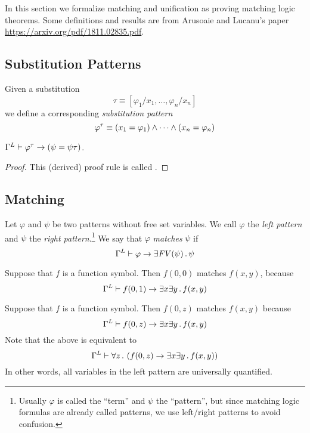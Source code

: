 \documentclass{article}
\begin{document}
In this section we formalize matching and unification as proving matching logic theorems.
Some definitions and results are from Arusoaie and Lucanu's paper \url{https://arxiv.org/pdf/1811.02835.pdf}. 

\subsection{Substitution Patterns}

\begin{definition}
Given a substitution
\[\tau \equiv [\varphi_1 / x_1 , \dots , \varphi_n / x_n] \]
we define a corresponding \emph{substitution pattern}
\[\varphi^\tau \equiv (x_1 = \varphi_1) \land \dots \land (x_n = \varphi_n) \]
\end{definition}

\begin{proposition}
$\Gamma^L \vdash \varphi^\tau \rightarrow (\psi = \psi\tau)$.
\end{proposition}
\begin{proof}
This (derived) proof rule is called . 
\end{proof}

\subsection{Matching}

\begin{definition}
\label{def:matching}
Let $\varphi$ and $\psi$ be two patterns without free set variables.
We call $\varphi$ the \emph{left pattern}
and $\psi$ the \emph{right pattern}.\footnote{Usually $\varphi$ is called the ``term'' and $\psi$ the ``pattern'', but since matching logic formulas are already called patterns, we use left/right patterns to avoid confusion.} 
We say that $\varphi$ \emph{matches} $\psi$
if
\[\Gamma^L \vdash \varphi \rightarrow \exists \mathit{FV(\psi)} \,.\, \psi \]
\end{definition}

\begin{example}
Suppose that $f$ is a function symbol. 
Then $f(0,0)$ matches $f(x,y)$, because
\[\Gamma^L \vdash f(0,1) \rightarrow \exists x \exists y \,.\, f(x,y)\]
\end{example}

\begin{example}
Suppose that $f$ is a function symbol.
Then $f(0,z)$ matches $f(x,y)$ because
\[\Gamma^L \vdash f(0,z) \rightarrow \exists x \exists y \,.\, f(x,y)\]
Note that the above is equivalent to
\[\Gamma^L \vdash \forall z \,.\, \left(f(0,z) \rightarrow \exists x \exists y \,.\, f(x,y)\right)\]
In other words, all variables in the left pattern are universally quantified.
\end{example}
\end{document}
